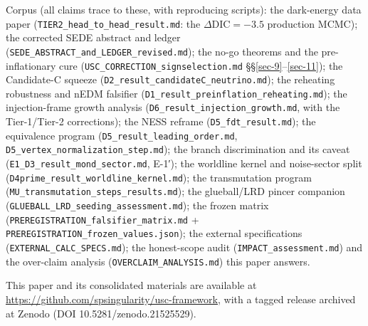 \documentclass[submission, Phys]{SciPost}
\begin{document}
Corpus (all claims trace to these, with reproducing scripts): the
dark-energy data paper (\texttt{TIER2\_head\_to\_head\_result.md}: the
\(\Delta\mathrm{DIC} = -3.5\) production MCMC); the corrected SEDE
abstract and ledger (\texttt{SEDE\_ABSTRACT\_and\_LEDGER\_revised.md});
the no-go theorems and the pre-inflationary cure
(\texttt{USC\_CORRECTION\_signselection.md}
§§\ref{sec-9}--\ref{sec-11}); the Candidate-C squeeze
(\texttt{D2\_result\_candidateC\_neutrino.md}); the reheating robustness
and nEDM falsifier (\texttt{D1\_result\_preinflation\_reheating.md});
the injection-frame growth analysis
(\texttt{D6\_result\_injection\_growth.md}, with the Tier-1/Tier-2
corrections); the NESS reframe (\texttt{D5\_fdt\_result.md}); the
equivalence program (\texttt{D5\_result\_leading\_order.md},
\texttt{D5\_vertex\_normalization\_step.md}); the branch discrimination
and its caveat (\texttt{E1\_D3\_result\_mond\_sector.md}, E-1′); the
worldline kernel and noise-sector split
(\texttt{D4prime\_result\_worldline\_kernel.md}); the transmutation
program (\texttt{MU\_transmutation\_steps\_results.md}); the
glueball/LRD pincer companion
(\texttt{GLUEBALL\_LRD\_seeding\_assessment.md}); the frozen matrix
(\texttt{PREREGISTRATION\_falsifier\_matrix.md} +
\texttt{PREREGISTRATION\_frozen\_values.json}); the external
specifications (\texttt{EXTERNAL\_CALC\_SPECS.md}); the honest-scope
audit (\texttt{IMPACT\_assessment.md}) and the over-claim analysis
(\texttt{OVERCLAIM\_ANALYSIS.md}) this paper answers.

This paper and its consolidated materials are available at
\url{https://github.com/spsingularity/usc-framework}, with a tagged
release archived at Zenodo (DOI 10.5281/zenodo.21525529).



\end{document}
